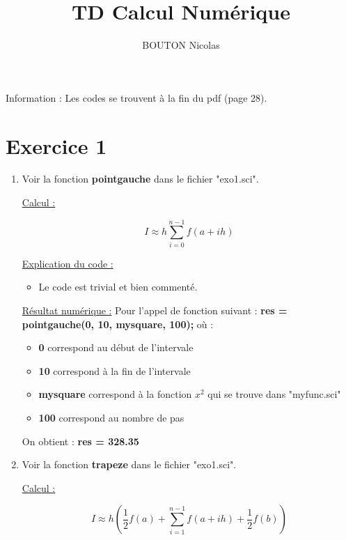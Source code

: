 \documentclass[12pt, letterpaper]{article}
\title{TD Calcul Numérique}
\author{BOUTON Nicolas}
\begin{document}
\maketitle

Information : Les codes se trouvent à la fin du pdf (page 28).

\newpage

\section*{Exercice 1}

\begin{enumerate}
\item Voir la fonction \textbf{pointgauche} dans le fichier
  "exo1.sci".

  \underline{Calcul :}

  \begin{equation*}
    I \approx h \sum_{i = 0}^{n-1}{f(a + ih)}
  \end{equation*}


  \underline{Explication du code :}
  \begin{itemize}
    \item Le code est trivial et bien commenté.
  \end{itemize}
  
  \underline{Résultat numérique :} \newline
  Pour l'appel de fonction suivant : \newline
  \textbf{res = pointgauche(0, 10, mysquare, 100);} \newline
  où :
  \begin{itemize}
  \item \textbf{0} correspond au début de l'intervale
  \item \textbf{10} correspond à la fin de l'intervale
  \item \textbf{mysquare} correspond à la fonction $x^2$ qui se trouve
    dans \newline "myfunc.sci"
  \item \textbf{100} correspond au nombre de pas
  \end{itemize}

  On obtient : \textbf{res = 328.35}
  
\item Voir la fonction \textbf{trapeze} dans le fichier "exo1.sci".

  \underline{Calcul :}

  \begin{equation*}
    I \approx h \left( \frac{1}{2} f(a) + \sum_{i = 1}^{n-1}{f(a + ih)} + \frac{1}{2} f(b) \right)
  \end{equation*}


\end{enumerate}
\end{document}

